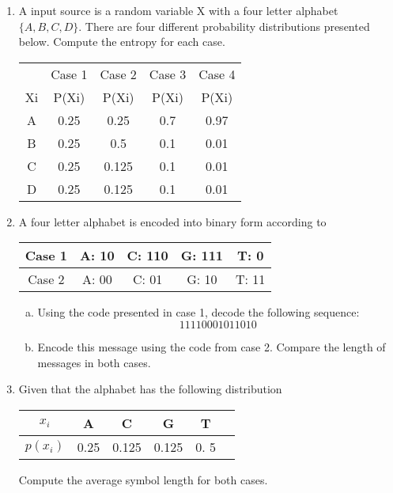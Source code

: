 \documentclass[a4paper,12pt]{article}
\begin{document}
\begin{enumerate}
\item

A input source is a random variable X with a four letter alphabet $\{A,B,C,D\}$.
There are four different probability distributions presented below. 
Compute the entropy for each case.

\begin{center}
\begin{tabular}{|cc|c|c|c|}
\hline
	&	Case 1	&	Case 2	&	Case 3	&	Case 4	\\	
Xi	&	P(Xi)	&	P(Xi)	&	P(Xi)	&	P(Xi)	\\	\hline
A	&	0.25	&	0.25	&	0.7	&	0.97	\\	\hline
B	&	0.25	&	0.5	&	0.1	&	0.01	\\	\hline
C	&	0.25	&	0.125	&	0.1	&	0.01	\\	\hline
D	&	0.25	&	0.125	&	0.1	&	0.01	\\	\hline
\end{tabular} 
\end{center}
\item 
A four letter alphabet is encoded into binary form according to
\begin{center}
 \begin{tabular}{|c|c|c|c|c|}
\hline
Case 1	&	A:  10 	&	C:  110	&	G:  111	& T:  0 \\ \hline
Case 2	&	A:  00	&	C:  01	&		G: 10	&	T: 11 \\ \hline
\end{tabular}    
\end{center}

\begin{enumerate}[(a)]
    \item Using the code presented in case 1, decode the following sequence:	
\[11110001011010\]
\item Encode this message using the code from case 2. Compare the length of messages in both cases.
\end{enumerate}	




\item 
Given that the alphabet has the following distribution 
\begin{center}
\begin{tabular}{|c|c|c|c|c|c|}
\hline
$x_i$	& A	& C	& G	& T \\ \hline
$p(x_i)$	& 0.25	& 0.125	& 0.125	& 0. 5 \\ \hline
\end{tabular} 
\end{center}
Compute the average symbol length for both cases.




\end{enumerate}
\end{document}
